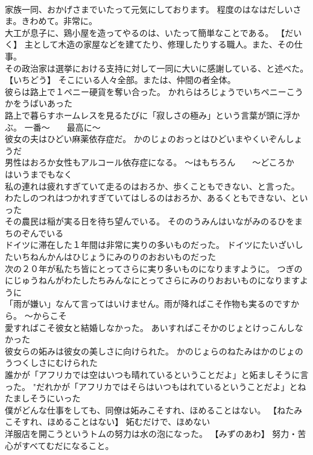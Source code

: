 \documentclass[8pt]{extreport}
\begin{document}
\begin{CJK}{UTF8}{min}
\\	家族一同、おかげさまでいたって元気にしております。	程度のはなはだしいさま。きわめて。非常に。
\\	大工が息子に、鶏小屋を造ってやるのは、いたって簡単なことである。	【だいく】 主として木造の家屋などを建てたり、修理したりする職人。また、その仕事。
\\	その政治家は選挙における支持に対して一同に大いに感謝している、と述べた。	【いちどう】 そこにいる人々全部。または、仲間の者全体。
\\	彼らは路上で１ペニー硬貨を奪い合った。	かれらはろじょうでいちペニーこうかをうばいあった 
\\	路上で暮らすホームレスを見るたびに「寂しさの極み」という言葉が頭に浮かぶ。	一番～　　最高に～
\\	彼女の夫はひどい麻薬依存症だ。	かのじょのおっとはひどいまやくいぞんしょうだ 
\\	男性はおろか女性もアルコール依存症になる。	～はもちろん　　～どころか　　はいうまでもなく
\\	私の連れは疲れすぎていて走るのはおろか、歩くこともできない、と言った。	わたしのつれはつかれすぎていてはしるのはおろか、あるくともできない、といった 
\\	その農民は稲が実る日を待ち望んでいる。	そののうみんはいながみのるひをまちのぞんでいる 
\\	ドイツに滞在した１年間は非常に実りの多いものだった。	ドイツにたいざいしたいちねんかんはひじょうにみのりのおおいものだった 
\\	次の２０年が私たち皆にとってさらに実り多いものになりますように。	つぎのにじゅうねんがわたしたちみんなにとってさらにみのりおおいものになりますように 
\\	「雨が嫌い」なんて言ってはいけません。雨が降ればこそ作物も実るのですから。	～からこそ
\\	愛すればこそ彼女と結婚しなかった。	あいすればこそかのじょとけっこんしなかった 
\\	彼女らの妬みは彼女の美しさに向けられた。	かのじょらのねたみはかのじょのうつくしさにむけられた 
\\	誰かが「アフリカでは空はいつも晴れているということだよ」と妬ましそうに言った。	"だれかが「アフリカではそらはいつもはれているということだよ」とねたましそうにいった 
\\	僕がどんな仕事をしても、同僚は妬みこそすれ、ほめることはない。	【ねたみこそすれ、ほめることはない】 妬むだけで、ほめない
\\	洋服店を開こうというトムの努力は水の泡になった。	【みずのあわ】 努力・苦心がすべてむだになること。

\end{CJK}
\end{document}
